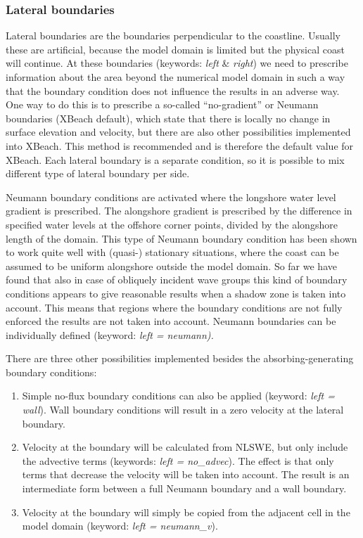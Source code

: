 \documentclass{article}
\begin{document}
\subsubsection{ Lateral boundaries}

\noindent Lateral boundaries are the boundaries perpendicular to the coastline. Usually these are artificial, because the model domain is limited but the physical coast will continue. At these boundaries (keywords: \textit{left} \& \textit{right}) we need to prescribe information about the area beyond the numerical model domain in such a way that the boundary condition does not influence the results in an adverse way. One way to do this is to prescribe a so-called ``no-gradient'' or Neumann boundaries (XBeach default), which state that there is locally no change in surface elevation and velocity, but there are also other possibilities implemented into XBeach. This method is recommended and is therefore the default value for XBeach. Each lateral boundary is a separate condition, so it is possible to mix different type of lateral boundary per side.

\noindent 

\noindent Neumann boundary conditions are activated where the longshore water level gradient is prescribed. The alongshore gradient is prescribed by the difference in specified water levels at the offshore corner points, divided by the alongshore length of the domain. This type of Neumann boundary condition has been shown to work quite well with (quasi-) stationary situations, where the coast can be assumed to be uniform alongshore outside the model domain. So far we have found that also in case of obliquely incident wave groups this kind of boundary conditions appears to give reasonable results when a shadow zone is taken into account. This means that regions where the boundary conditions are not fully enforced the results are not taken into account. Neumann boundaries can be individually defined (keyword: \textit{left = neumann).} 

\noindent 

\noindent There are three other possibilities implemented besides the absorbing-generating boundary conditions:

\begin{enumerate}
\item  Simple no-flux boundary conditions can also be applied (keyword: \textit{left = wall}). Wall boundary conditions will result in a zero velocity at the lateral boundary.

\item  Velocity at the boundary will be calculated from NLSWE, but only include the advective terms (keywords: \textit{left = no\_advec}). The effect is that only terms that decrease the velocity will be taken into account. The result is an intermediate form between a full Neumann boundary and a wall boundary. 

\item  Velocity at the boundary will simply be copied from the adjacent cell in the model domain (keyword: \textit{left = neumann\_v}). 
\end{enumerate}
\end{document}
